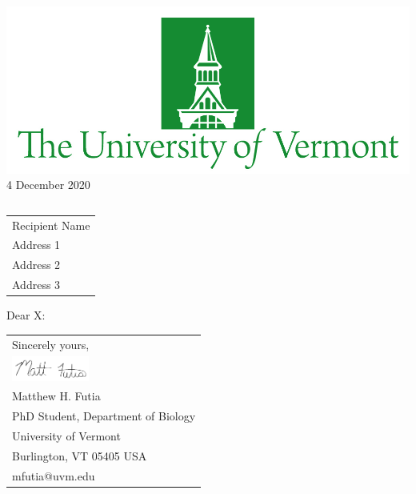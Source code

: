 \documentclass[10pt]{article} %
\begin{document}

\raggedright %
\includegraphics[scale=0.25]{UVMLogo.jpg}\\ %

 \hfill\hfill\hfill %
 4 December 2020\\[10pt]  %
 
\begin{tabular}{l@{}}
\end{tabular}

\begin{tabular}{@{}l}
Recipient Name\\
Address 1\\
Address 2\\
Address 3
\end{tabular}


Dear X:

\lipsum[1-2]





\begin{tabular}{@{}l}
Sincerely yours,\\
\includegraphics[scale=0.15,width=1in]{Signature.png}\\
Matthew H. Futia\\
PhD Student, Department of Biology\\
University of Vermont\\
Burlington, VT 05405 USA\\
mfutia@uvm.edu\\
\end{tabular}
\end{document}
